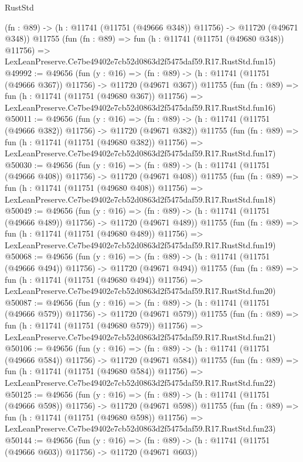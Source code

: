 \begin{lexlean}{RustStd}
\begin{coremodule}
    (fn : @89) -> (h : @11741 (@11751 (@49666 @348)) @11756) -> @11720 (@49671 @348))
    @11755
    (fun (fn : @89) =>
    fun (h : @11741 (@11751 (@49680 @348)) @11756) =>
    LexLeanPreserve.Ce7be49402e7cb52d0863d2f5475daf59.R17.RustStd.fun15)
@49992 := @49656
    (fun (y : @16) =>
    (fn : @89) -> (h : @11741 (@11751 (@49666 @367)) @11756) -> @11720 (@49671 @367))
    @11755
    (fun (fn : @89) =>
    fun (h : @11741 (@11751 (@49680 @367)) @11756) =>
    LexLeanPreserve.Ce7be49402e7cb52d0863d2f5475daf59.R17.RustStd.fun16)
@50011 := @49656
    (fun (y : @16) =>
    (fn : @89) -> (h : @11741 (@11751 (@49666 @382)) @11756) -> @11720 (@49671 @382))
    @11755
    (fun (fn : @89) =>
    fun (h : @11741 (@11751 (@49680 @382)) @11756) =>
    LexLeanPreserve.Ce7be49402e7cb52d0863d2f5475daf59.R17.RustStd.fun17)
@50030 := @49656
    (fun (y : @16) =>
    (fn : @89) -> (h : @11741 (@11751 (@49666 @408)) @11756) -> @11720 (@49671 @408))
    @11755
    (fun (fn : @89) =>
    fun (h : @11741 (@11751 (@49680 @408)) @11756) =>
    LexLeanPreserve.Ce7be49402e7cb52d0863d2f5475daf59.R17.RustStd.fun18)
@50049 := @49656
    (fun (y : @16) =>
    (fn : @89) -> (h : @11741 (@11751 (@49666 @489)) @11756) -> @11720 (@49671 @489))
    @11755
    (fun (fn : @89) =>
    fun (h : @11741 (@11751 (@49680 @489)) @11756) =>
    LexLeanPreserve.Ce7be49402e7cb52d0863d2f5475daf59.R17.RustStd.fun19)
@50068 := @49656
    (fun (y : @16) =>
    (fn : @89) -> (h : @11741 (@11751 (@49666 @494)) @11756) -> @11720 (@49671 @494))
    @11755
    (fun (fn : @89) =>
    fun (h : @11741 (@11751 (@49680 @494)) @11756) =>
    LexLeanPreserve.Ce7be49402e7cb52d0863d2f5475daf59.R17.RustStd.fun20)
@50087 := @49656
    (fun (y : @16) =>
    (fn : @89) -> (h : @11741 (@11751 (@49666 @579)) @11756) -> @11720 (@49671 @579))
    @11755
    (fun (fn : @89) =>
    fun (h : @11741 (@11751 (@49680 @579)) @11756) =>
    LexLeanPreserve.Ce7be49402e7cb52d0863d2f5475daf59.R17.RustStd.fun21)
@50106 := @49656
    (fun (y : @16) =>
    (fn : @89) -> (h : @11741 (@11751 (@49666 @584)) @11756) -> @11720 (@49671 @584))
    @11755
    (fun (fn : @89) =>
    fun (h : @11741 (@11751 (@49680 @584)) @11756) =>
    LexLeanPreserve.Ce7be49402e7cb52d0863d2f5475daf59.R17.RustStd.fun22)
@50125 := @49656
    (fun (y : @16) =>
    (fn : @89) -> (h : @11741 (@11751 (@49666 @598)) @11756) -> @11720 (@49671 @598))
    @11755
    (fun (fn : @89) =>
    fun (h : @11741 (@11751 (@49680 @598)) @11756) =>
    LexLeanPreserve.Ce7be49402e7cb52d0863d2f5475daf59.R17.RustStd.fun23)
@50144 := @49656
    (fun (y : @16) =>
    (fn : @89) -> (h : @11741 (@11751 (@49666 @603)) @11756) -> @11720 (@49671 @603))

\end{coremodule}
\end{lexlean}
